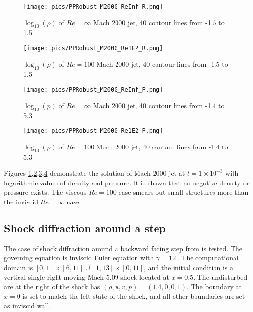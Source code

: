 \documentclass[preprint,12pt]{elsarticle}
\begin{document}
\begin{figure}[htbp]
    \centering
    \texttt{[image: pics/PPRobust\_M2000\_ReInf\_R.png]}
    \caption{$\log_{10}(\rho)$ of $Re=\infty$ Mach 2000 jet, 40 contour lines from -1.5 to 1.5}
    \label{fig:M2000_ReInf_R}
\end{figure}

\begin{figure}[htbp]
    \centering
    \texttt{[image: pics/PPRobust\_M2000\_Re1E2\_R.png]}
    \caption{$\log_{10}(\rho)$ of $Re=100$ Mach 2000 jet, 40 contour lines from -1.5 to 1.5}
    \label{fig:M2000_Re1E2_R}
\end{figure}

\begin{figure}[htbp]
    \centering
    \texttt{[image: pics/PPRobust\_M2000\_ReInf\_P.png]}
    \caption{$\log_{10}(p)$ of $Re=\infty$ Mach 2000 jet, 40 contour lines from -1.4 to 5.3}
    \label{fig:M2000_ReInf_P}
\end{figure}

\begin{figure}[htbp]
    \centering
    \texttt{[image: pics/PPRobust\_M2000\_Re1E2\_P.png]}
    \caption{$\log_{10}(p)$ of $Re=100$ Mach 2000 jet, 40 contour lines from -1.4 to 5.3}
    \label{fig:M2000_Re1E2_P}
\end{figure}

Figures \ref{fig:M2000_ReInf_R},\ref{fig:M2000_Re1E2_R},\ref{fig:M2000_ReInf_P},\ref{fig:M2000_Re1E2_P}
demonstrate the solution of Mach 2000 jet at $t=1\times10^{-3}$ with 
logarithmic values of density and pressure. 
It is shown that no negative density or pressure exists.
The viscous $Re=100$ case smears out small structures more than 
the inviscid $Re=\infty$ case.


\subsection{Shock diffraction around a step}

The case of shock diffraction around a backward facing step 
from \cite{zhang2010positivity} is tested. 
The governing equation is inviscid Euler equation with $\gamma = 1.4$.
The computational domain is $[0,1]\times[6,11]\cup [1,13]\times[0,11]$,
and the initial condition is a vertical single right-moving Mach 5.09
shock located at $x=0.5$.
The undisturbed are at the right of the shock has $(\rho, u, v, p)=(1.4,0,0,1)$.
The boundary at $x=0$ is set to match the left state of the shock, and 
all other boundaries are set as inviscid wall.
\end{document}
